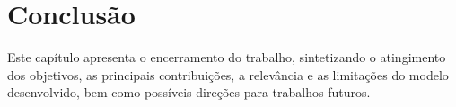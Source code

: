 \chapter{Conclusão}
\label{sec_Conclusao}

Este capítulo apresenta o encerramento do trabalho, sintetizando o atingimento dos objetivos, as principais contribuições, a relevância e as limitações do modelo desenvolvido, bem como possíveis direções para trabalhos futuros.



% 

% 

% 

% 

